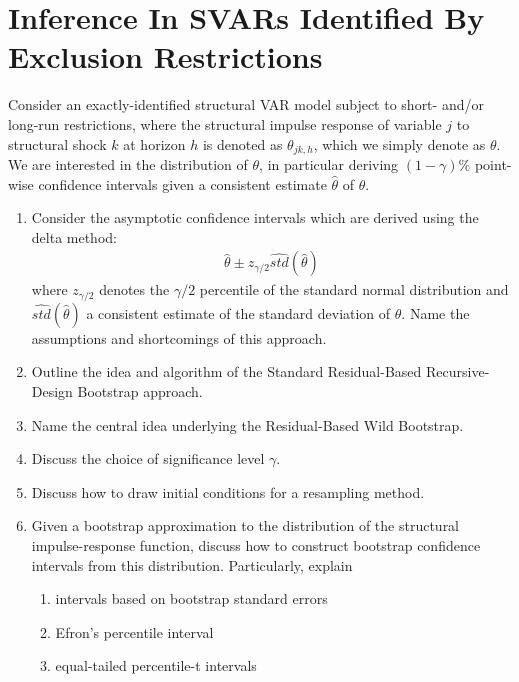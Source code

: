 \section[Inference In SVARs Identified By Exclusion Restrictions]{Inference In SVARs Identified By Exclusion Restrictions\label{ex:InferenceExclusionRestrictions}}
Consider an exactly-identified structural VAR model subject to short- and/or long-run restrictions,
  where the structural impulse response of variable \(j\) to structural shock \(k\) at horizon \(h\) is denoted as \(\theta_{jk,h}\),
  which we simply denote as \(\theta \).
We are interested in the distribution of \(\theta \),
  in particular deriving \((1-\gamma)\% \) point-wise confidence intervals given a consistent estimate \(\hat{\theta}\) of \(\theta \).

\begin{enumerate}	
\item Consider the asymptotic confidence intervals which are derived using the delta method:
\begin{align*}
\hat{\theta} \pm z_{\gamma/2} \widehat{std}(\hat{\theta})
\end{align*}
where \(z_{\gamma/2}\) denotes the \(\gamma/2\) percentile of the standard normal distribution
  and \( \widehat{std}(\hat{\theta})\) a consistent estimate of the standard deviation of \(\theta \).
Name the assumptions and shortcomings of this approach.

\item Outline the idea and algorithm of the Standard Residual-Based Recursive-Design Bootstrap approach.

\item Name the central idea underlying the Residual-Based Wild Bootstrap.

\item Discuss the choice of significance level \(\gamma \).

\item Discuss how to draw initial conditions for a resampling method.

\item Given a bootstrap approximation to the distribution of the structural impulse-response function,
  discuss how to construct bootstrap confidence intervals from this distribution.
Particularly, explain
\begin{enumerate}
\item intervals based on bootstrap standard errors
\item Efron's percentile interval
\item equal-tailed percentile-t intervals 		
\end{enumerate}

\end{enumerate}


